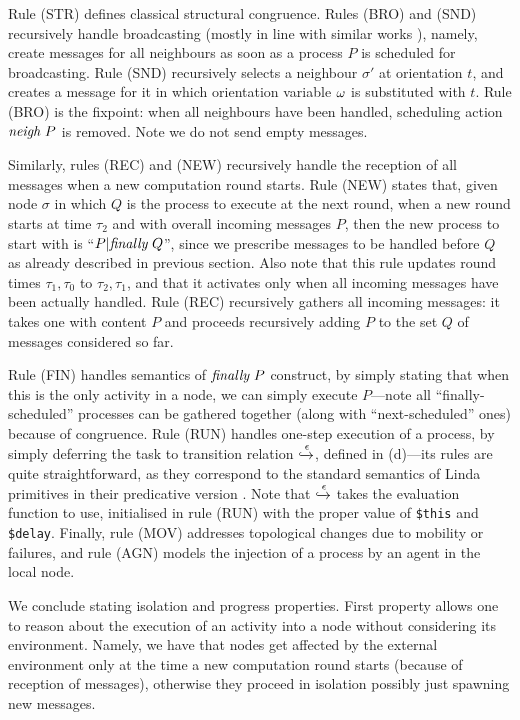 \documentclass[12pt,a4paper,twoside,openright]{book}
\begin{document}
Rule (STR) defines classical structural congruence.
%
Rules (BRO) and (SND) recursively handle broadcasting (mostly in line with similar works \cite{wsnpa}), namely, create messages for all neighbours as soon as a process $P$ is scheduled for broadcasting.
%
Rule (SND) recursively selects a neighbour $\sigma'$ at orientation $t$, and creates a message for it in which orientation variable $\omega$ is substituted with $t$.
%
Rule (BRO) is the fixpoint: when all neighbours have been handled, scheduling action $\textit{neigh}~P$ is removed. Note we do not send empty messages.

Similarly, rules (REC) and (NEW) recursively handle the reception of all messages when a new computation round starts.
%
Rule (NEW) states that, given node $\sigma$ in which $Q$ is the process to execute at the next round, when a new round starts at time $\tau_2$ and with overall incoming messages $P$, then the new process to start with is ``$P|\textit{finally}~Q$'', since we prescribe messages to be handled before $Q$ as already described in previous section.
%
Also note that this rule updates round times $\tau_1,\tau_0$ to $\tau_2,\tau_1$,  and that it activates only when all incoming messages have been actually handled.
%
Rule (REC) recursively gathers all incoming messages: it takes one with content $P$ and proceeds recursively adding $P$ to the set $Q$ of messages considered so far.

Rule (FIN) handles semantics of $\textit{finally}~P$ construct, by simply stating that when this is the only activity in a node, we can simply execute $P$---note all ``finally-scheduled'' processes can be gathered together (along with ``next-scheduled'' ones) because of congruence. 
%
Rule (RUN) handles one-step execution of a process, by simply deferring the task to transition relation $\xhookrightarrow{\epsilon}$, defined in  (d)---its rules are quite straightforward, as they correspond to the standard semantics of Linda primitives in their predicative version \cite{zavattaro}.
%
Note that $\xhookrightarrow{\epsilon}$ takes the evaluation function to use, initialised in rule (RUN) with the proper value of \texttt{\$this} and \texttt{\$delay}.
%
Finally, rule (MOV) addresses topological changes due to mobility or failures, and rule (AGN) models the injection of a process by an agent in the local node.

We conclude stating isolation and progress properties. 
%
First property allows one to reason about the execution of an activity into a node without considering its environment.
%
Namely, we have that nodes get affected by the external environment only at the time a new computation round starts (because of reception of messages), otherwise they proceed in isolation possibly just spawning new messages.
\end{document}

